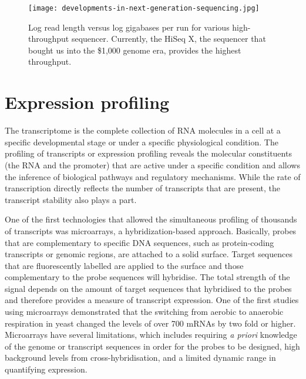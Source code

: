 \begin{figure}[!ht]
   \centering
   \texttt{[image: developments-in-next-generation-sequencing.jpg]}
   \caption[Developments in next generation sequencing]{Log read length versus log gigabases per run for various high-throughput sequencer\cite{Nederbragt2012}. Currently, the HiSeq X, the sequencer that bought us into the \$1,000 genome era, provides the highest throughput.}
   \label{fig:dev_next_gen}
\end{figure}

\section{Expression profiling}

The transcriptome is the complete collection of RNA molecules in a cell at a specific developmental stage or under a specific physiological condition. The profiling of transcripts or expression profiling reveals the molecular constituents (the RNA and the promoter) that are active under a specific condition and allows the inference of biological pathways and regulatory mechanisms. While the rate of transcription directly reflects the number of transcripts that are present, the transcript stability also plays a part.

One of the first technologies that allowed the simultaneous profiling of thousands of transcripts was microarrays\cite{pmid7569999}, a hybridization-based approach. Basically, probes that are complementary to specific DNA sequences, such as protein-coding transcripts or genomic regions, are attached to a solid surface. Target sequences that are fluorescently labelled are applied to the surface and those complementary to the probe sequences will hybridise. The total strength of the signal depends on the amount of target sequences that hybridised to the probes and therefore provides a measure of transcript expression. One of the first studies using microarrays demonstrated that the switching from aerobic to anaerobic respiration in yeast changed the levels of over 700 mRNAs by two fold or higher\cite{pmid9381177}. Microarrays have several limitations, which includes requiring \textit{a priori} knowledge of the genome or transcript sequences in order for the probes to be designed, high background levels from cross-hybridisation\cite{pmid16749918}, and a limited dynamic range in quantifying expression.

